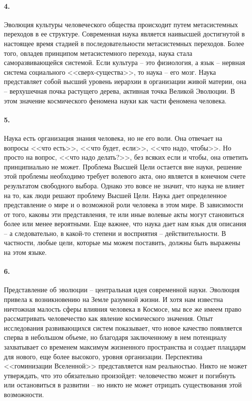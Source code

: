 \documentclass{book}
\begin{document}
\paragraph{4.} Эволюция культуры человеческого общества происходит путем метасистемных переходов в ее структуре. Современная наука является наивысшей достигнутой в настоящее время стадией в последовательности метасистемных переходов. Более того, овладев принципом метасистемного перехода, наука стала саморазвивающейся системой. Если культура -- это физиология, а язык -- нервная система социального <<сверх-существа>>, то наука -- его мозг. Наука представляет собой высший уровень иерархии в организации живой материи, она -- верхушечная почка растущего дерева, активная точка Великой Эволю­ции. В этом значение космического феномена науки как части феномена человека.

\paragraph{5.} Наука есть организация знания человека, но не его воли. Она отвечает на вопросы <<что есть>>, <<что будет, если>>, <<что надо, чтобы>>. Но просто на вопрос, <<что надо делать?>>, без всяких если и чтобы, она ответить принципиально не может. Проблема Высшей Цели остается вне науки, решение этой проблемы необ­ходимо требует волевого акта, оно является в конечном счете результатом свободного выбора.
Однако это вовсе не значит, что наука не влияет на то, как люди решают проблему Высшей Цели. Наука дает определенное представление о мире и о возможной роли человека в этом мире. В зависимости от того, каковы эти представления, те или иные волевые акты могут становиться более или менее ве­роятными. Еще важнее, что наука дает нам язык для описания -- а следовательно, в какой-то степени и восприятия -- действительности. В частности, любые цели, которые мы можем поста­вить, должны быть выражены на этом языке.

\paragraph{6.} Представление об эволюции -- центральная идея современной науки. Эволюция привела к возникновению на Земле разумной жизни. И хотя нам известна ничтожная малость сферы влияния человека в Космосе, мы все же имеем право рассматривать человечество как явление космического значения. Опыт исследования развивающихся систем показывает, что новое качество появляется сперва в небольшом объеме, но благодаря заключенному в нем потенциалу захватывает со временем максимум жизненного пространства и создает плацдарм для нового, еще более высокого, уровня организации. Перспектива <<гоминизации Вселенной>> представляется нам реальностью. Никто не может утверждать, что это обязательно произойдет: человечество может и погибнуть или остановиться в развитии -- но никто не может отрицать существования этой возможности.
\end{document}
